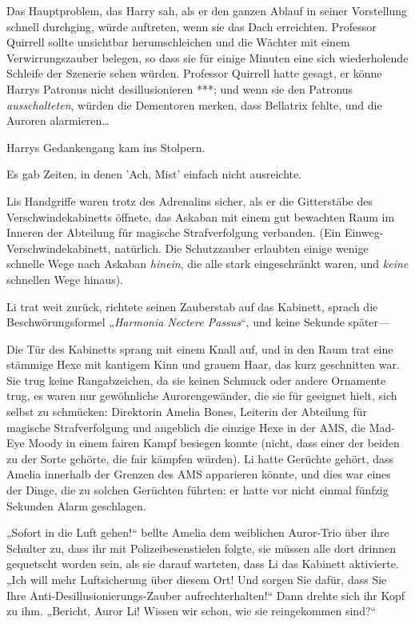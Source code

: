 {Das Hauptproblem, das Harry sah, als er den ganzen Ablauf in seiner Vorstellung schnell durchging, würde auftreten, wenn sie das Dach erreichten. Professor Quirrell sollte unsichtbar herumschleichen und die Wächter mit einem Verwirrungszauber belegen, so dass sie für einige Minuten eine sich wiederholende Schleife der Szenerie sehen würden. Professor Quirrell hatte gesagt, er könne Harrys Patronus nicht desillusionieren ***; und wenn sie den Patronus \emph{ausschalteten}, würden die Dementoren merken, dass Bellatrix fehlte, und die Auroren alarmieren…

Harrys Gedankengang kam ins Stolpern.

Es gab Zeiten, in denen 'Ach, Mist' einfach nicht ausreichte.

Lis Handgriffe waren trotz des Adrenalins sicher, als er die Gitterstäbe des Verschwindekabinetts öffnete, das Askaban mit einem gut bewachten Raum im Inneren der Abteilung für magische Strafverfolgung verbanden. (Ein Einweg-Verschwindekabinett, natürlich. Die Schutzzauber erlaubten einige wenige schnelle Wege nach Askaban \emph{hinein}, die alle stark eingeschränkt waren, und \emph{keine} schnellen Wege hinaus).

Li trat weit zurück, richtete seinen Zauberstab auf das Kabinett, sprach die Beschwörungsformel „\emph{Harmonia Nectere Passus}“, und keine Sekunde später—

Die Tür des Kabinetts sprang mit einem Knall auf, und in den Raum trat eine stämmige Hexe mit kantigem Kinn und grauem Haar, das kurz geschnitten war. Sie trug keine Rangabzeichen, da sie keinen Schmuck oder andere Ornamente trug, es waren nur gewöhnliche Aurorengewänder, die sie für geeignet hielt, sich selbst zu schmücken: Direktorin Amelia Bones, Leiterin der Abteilung für magische Strafverfolgung und angeblich die einzige Hexe in der AMS, die Mad-Eye Moody in einem fairen Kampf besiegen konnte (nicht, dass einer der beiden zu der Sorte gehörte, die fair kämpfen würden). Li hatte Gerüchte gehört, dass Amelia innerhalb der Grenzen des AMS apparieren könnte, und dies war eines der Dinge, die zu solchen Gerüchten führten: er hatte vor nicht einmal fünfzig Sekunden Alarm geschlagen.

„Sofort in die Luft gehen!“ bellte Amelia dem weiblichen Auror-Trio über ihre Schulter zu, dass ihr mit Polizeibesenstielen folgte, sie müssen alle dort drinnen gequetscht worden sein, als sie darauf warteten, dass Li das Kabinett aktivierte. „Ich will mehr Luftsicherung über diesem Ort! Und sorgen Sie dafür, dass Sie Ihre Anti-Desillusionierungs-Zauber aufrechterhalten!“ Dann drehte sich ihr Kopf zu ihm. „Bericht, Auror Li! Wissen wir schon, wie sie reingekommen sind?“

}
